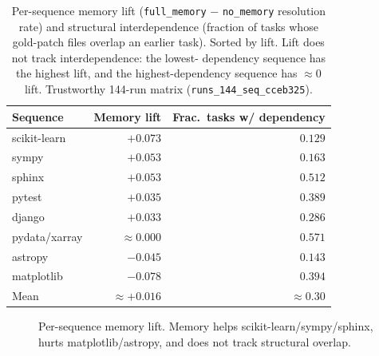 \begin{table}[htbp]
  \centering
  \caption{Per-sequence memory lift (\texttt{full\_memory} $-$ \texttt{no\_memory}
  resolution rate) and structural interdependence (fraction of tasks whose gold-patch files
  overlap an earlier task). Sorted by lift. Lift does not track interdependence: the lowest-
  dependency sequence has the highest lift, and the highest-dependency sequence has
  $\approx 0$ lift. Trustworthy 144-run matrix (\texttt{runs\_144\_seq\_cceb325}).}
  \label{tab:memory-lift}
  \begin{tabular}{lrr}
    \toprule
    Sequence & Memory lift & Frac.\ tasks w/ dependency \\
    \midrule
    scikit-learn   & $+0.073$ & $0.129$ \\
    sympy          & $+0.053$ & $0.163$ \\
    sphinx         & $+0.053$ & $0.512$ \\
    pytest         & $+0.035$ & $0.389$ \\
    django         & $+0.033$ & $0.286$ \\
    pydata/xarray  & $\approx 0.000$ & $0.571$ \\
    astropy        & $-0.045$ & $0.143$ \\
    matplotlib     & $-0.078$ & $0.394$ \\
    \midrule
    Mean           & $\approx +0.016$ & $\approx 0.30$ \\
    \bottomrule
  \end{tabular}
\end{table}

\begin{figure}[htbp]
\centering
{}
\caption{Per-sequence memory lift. Memory helps scikit-learn/sympy/sphinx, hurts
matplotlib/astropy, and does not track structural overlap.}\label{fig:memory-lift}
\end{figure}

